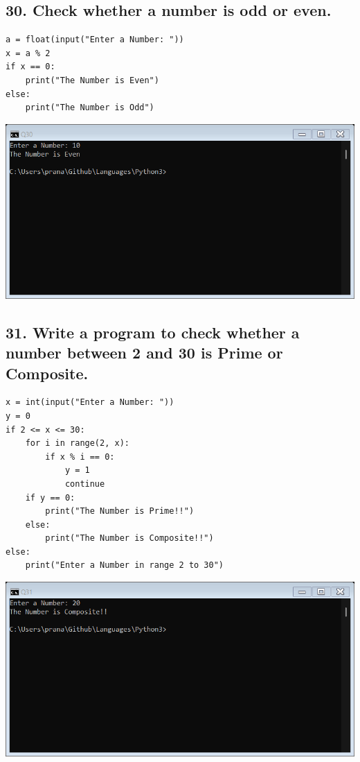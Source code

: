 \documentclass[12pt]{article}
\begin{document}
\subsection*{30. Check whether a number is odd or even.}
\begin{verbatim}
a = float(input("Enter a Number: "))
x = a % 2
if x == 0:
    print("The Number is Even")
else:
    print("The Number is Odd")
\end{verbatim}
\includegraphics[width=\linewidth]{images/30.png}

\subsection*{31. Write a program to check whether a number between 2 and 30 is Prime or Composite.}
\begin{verbatim}
x = int(input("Enter a Number: "))
y = 0
if 2 <= x <= 30:
    for i in range(2, x):
        if x % i == 0:
            y = 1
            continue
    if y == 0:
        print("The Number is Prime!!")
    else:
        print("The Number is Composite!!")
else:
    print("Enter a Number in range 2 to 30")
\end{verbatim}
\includegraphics[width=\linewidth]{images/31.png}
\end{document}
